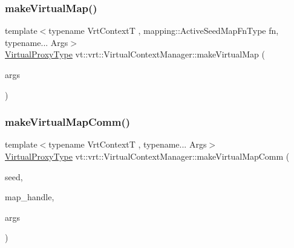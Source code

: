 \subsubsection{\texorpdfstring{make\+Virtual\+Map()}{makeVirtualMap()}\hspace{0.1cm}{\footnotesize\ttfamily [2/2]}}
{\footnotesize\ttfamily template$<$typename Vrt\+ContextT , mapping\+::\+Active\+Seed\+Map\+Fn\+Type fn, typename... Args$>$ \\
\hyperlink{namespacevt_a1b417dd5d684f045bb58a0ede70045ac}{Virtual\+Proxy\+Type} vt\+::vrt\+::\+Virtual\+Context\+Manager\+::make\+Virtual\+Map (\begin{DoxyParamCaption}\item[{Args...}]{args }\end{DoxyParamCaption})}

\mbox{\label{structvt_1_1vrt_1_1_virtual_context_manager_af58e1757a222301b32b9964ea413cd00}} 
\subsubsection{\texorpdfstring{make\+Virtual\+Map\+Comm()}{makeVirtualMapComm()}}
{\footnotesize\ttfamily template$<$typename Vrt\+ContextT , typename... Args$>$ \\
\hyperlink{namespacevt_a1b417dd5d684f045bb58a0ede70045ac}{Virtual\+Proxy\+Type} vt\+::vrt\+::\+Virtual\+Context\+Manager\+::make\+Virtual\+Map\+Comm (\begin{DoxyParamCaption}\item[{\hyperlink{namespacevt_ae2e13198bdef4d5b8e603d6c1c7f0969}{Seed\+Type} const \&}]{seed,  }\item[{\hyperlink{namespacevt_af64846b57dfcaf104da3ef6967917573}{Handler\+Type} const}]{map\+\_\+handle,  }\item[{Args \&\&...}]{args }\end{DoxyParamCaption})\hspace{0.3cm}{\ttfamily [private]}}

\mbox{\label{structvt_1_1vrt_1_1_virtual_context_manager_a18c6dad4c4c963f883c59f64f78e36cb}} 
